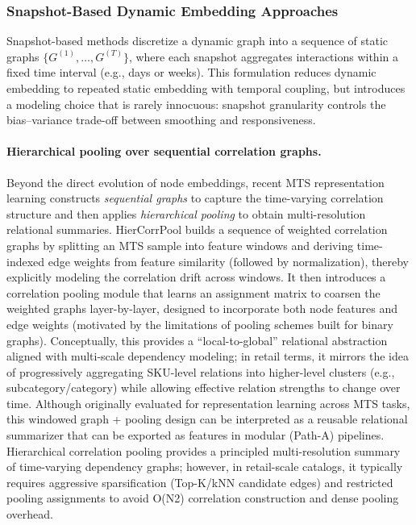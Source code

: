 \subsubsection{Snapshot-Based Dynamic Embedding Approaches}
Snapshot-based methods discretize a dynamic graph into a sequence of static graphs $\{G^{(1)}, \ldots, G^{(T)}\}$, where each snapshot aggregates interactions within a fixed time interval (e.g., days or weeks). This formulation reduces dynamic embedding to repeated static embedding with temporal coupling, but introduces a modeling choice that is rarely innocuous: snapshot granularity controls the bias--variance trade-off between smoothing and responsiveness.

\paragraph{Hierarchical pooling over sequential correlation graphs.}
Beyond the direct evolution of node embeddings, recent MTS representation learning constructs \emph{sequential graphs} to capture the time-varying correlation structure and then applies \emph{hierarchical pooling} to obtain multi-resolution relational summaries. HierCorrPool \cite{wang2024hiercorrpool} builds a sequence of weighted correlation graphs by splitting an MTS sample into feature windows and deriving time-indexed edge weights from feature similarity (followed by normalization), thereby explicitly modeling the correlation drift across windows. It then introduces a correlation pooling module that learns an assignment matrix to coarsen the weighted graphs layer-by-layer, designed to incorporate both node features and edge weights (motivated by the limitations of pooling schemes built for binary graphs). Conceptually, this provides a “local-to-global” relational abstraction aligned with multi-scale dependency modeling; in retail terms, it mirrors the idea of progressively aggregating SKU-level relations into higher-level clusters (e.g., subcategory/category) while allowing effective relation strengths to change over time.
Although originally evaluated for representation learning across MTS tasks, this windowed graph + pooling design can be interpreted as a reusable relational summarizer that can be exported as features in modular (Path-A) pipelines.
Hierarchical correlation pooling provides a principled multi-resolution summary of time-varying dependency graphs; however, in retail-scale catalogs, it typically requires aggressive sparsification (Top-K/kNN candidate edges) and restricted pooling assignments to avoid O(N2) correlation construction and dense pooling overhead.

